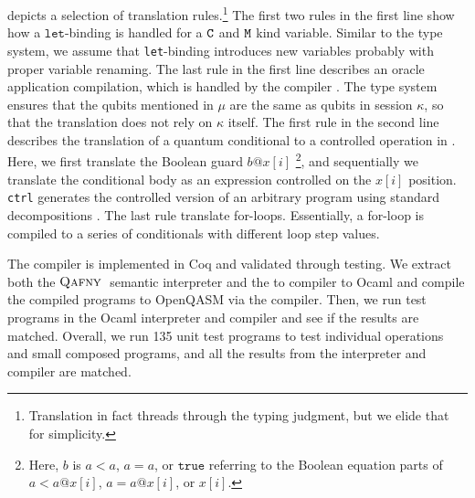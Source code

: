  depicts a selection of translation rules.\footnote{Translation in fact threads through the typing judgment, but we elide that for simplicity.}
The first two rules in the first line show how a $\texttt{let}$-binding is handled for a $\texttt{C}$ and $\texttt{M}$ kind variable.
Similar to the type system, we assume that \texttt{let}-binding introduces new variables probably with proper variable renaming.
The last rule in the first line describes an oracle application compilation, which is handled by the \oqasm compiler \cite{oracleoopsla}. The \qafny type system ensures that the qubits mentioned in $\mu$ are the same as qubits in session $\kappa$, so that the translation does not rely on $\kappa$ itself.
The first rule in the second line describes the translation of a quantum conditional to a controlled operation in \sqir.
Here, we first translate the Boolean guard $b@x[i]$ \footnote{Here, $b$ is $a < a$, $a=a$, or $\texttt{true}$ referring to the Boolean equation parts of $a < a @ x[i]$, $a=a @ x[i] $, or $x[i]$. }, and sequentially we translate the conditional body as an \sqir expression controlled on the $x[i]$ position. \texttt{ctrl} generates the controlled version of an arbitrary \sqir program using standard decompositions \cite[Chapter 4.3]{mike-and-ike}.
The last rule translate \qafny for-loops. Essentially, a for-loop is compiled to a series of conditionals with different loop step values. 

The compiler is implemented in Coq and validated through testing. We extract both the $\textsc{Qafny}\;$ semantic interpreter and the \qafny to \sqir compiler to Ocaml and compile the compiled \sqir programs to OpenQASM \cite{cross2021openqasm} via the \sqir compiler. Then, we run test programs in the \qafny Ocaml interpreter and compiler and see if the results are matched. Overall, we run 135 unit test programs to test individual operations and small composed programs, and all the results from the \qafny interpreter and compiler are matched.




